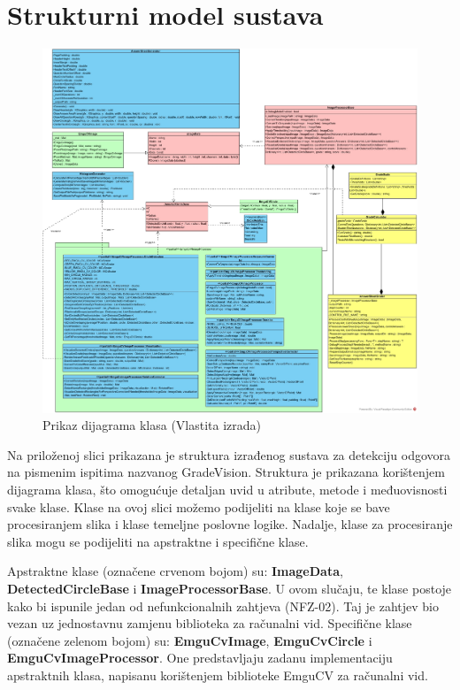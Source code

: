 \documentclass{foi}
\begin{document}
\section{Strukturni model sustava} 


\begin{figure}[H]
    \centering
    \includegraphics[width=1.0\linewidth]{slike/classDiagram.png}
    \caption{Prikaz dijagrama klasa (Vlastita izrada)}
\end{figure}

Na priloženoj slici prikazana je struktura izrađenog sustava za detekciju odgovora na pismenim ispitima nazvanog GradeVision. Struktura je prikazana korištenjem dijagrama klasa, što omogućuje detaljan uvid u atribute, metode i međuovisnosti svake klase. Klase na ovoj slici možemo podijeliti na klase koje se bave procesiranjem slika i klase temeljne poslovne logike. Nadalje, klase za procesiranje slika mogu se podijeliti na apstraktne i specifične klase.

Apstraktne klase (označene crvenom bojom) su: \textbf{ImageData}, \textbf{DetectedCircleBase} i \textbf{ImageProcessorBase}. U ovom slučaju, te klase postoje kako bi ispunile jedan od nefunkcionalnih zahtjeva (NFZ-02). Taj je zahtjev bio vezan uz jednostavnu zamjenu biblioteka za računalni vid.
Specifične klase (označene zelenom bojom) su: \textbf{EmguCvImage}, \textbf{EmguCvCircle} i \textbf{EmguCvImageProcessor}. One predstavljaju zadanu implementaciju apstraktnih klasa, napisanu korištenjem biblioteke EmguCV za računalni vid.
\end{document}
